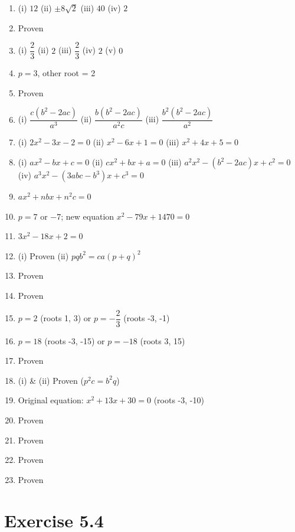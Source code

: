 \documentclass[12pt,a4paper]{article}
\begin{document}
\begin{enumerate}[label=Example \arabic*.]
    \item (i) \( 12 \) \quad (ii) \( \pm 8\sqrt{2} \) \quad (iii) \( 40 \) \quad (iv) \( 2 \)
    \item Proven
    \item (i) \( \dfrac{2}{3} \) \quad (ii) \( 2 \) \quad (iii) \( \dfrac{2}{3} \) \quad (iv) \( 2 \) \quad (v) \( 0 \)
    \item \( p = 3 \), other root = 2
    \item Proven
    \item (i) \( \dfrac{c(b^2-2ac)}{a^3} \) \quad (ii) \( \dfrac{b(b^2-2ac)}{a^2 c} \) \quad (iii) \( \dfrac{b^2(b^2-2ac)}{a^2} \)
    \item (i) \( 2x^2 - 3x - 2 = 0 \) \quad (ii) \( x^2 - 6x + 1 = 0 \) \quad (iii) \( x^2 + 4x + 5 = 0 \)
    \item (i) \( ax^2 - bx + c = 0 \) \quad (ii) \( cx^2 + bx + a = 0 \) \quad (iii) \( a^2 x^2 - (b^2 - 2ac)x + c^2 = 0 \) \quad (iv) \( a^3 x^2 - (3abc - b^3)x + c^3 = 0 \)
    \item \( ax^2 + n b x + n^2 c = 0 \)
    \item \( p = 7 \) or \( -7 \); new equation \( x^2 - 79x + 1470 = 0 \)
    \item \( 3x^2 - 18x + 2 = 0 \)
    \item (i) Proven \quad (ii) \( p q b^2 = c a (p + q)^2 \)
    \item Proven
    \item Proven
    \item \( p = 2 \) (roots 1, 3) or \( p = -\dfrac{2}{3} \) (roots -3, -1)
    \item \( p = 18 \) (roots -3, -15) or \( p = -18 \) (roots 3, 15)
    \item Proven
    \item (i) \& (ii) Proven (\( p^2 c = b^2 q \))
    \item Original equation: \( x^2 + 13x + 30 = 0 \) (roots -3, -10)
    \item Proven
    \item Proven
    \item Proven
    \item Proven
\end{enumerate}


\section*{Exercise 5.4}
\end{document}
